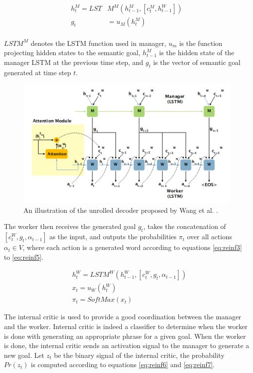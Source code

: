 \documentclass[preprint, 10pt]{elsarticle}
\begin{document}
		\begin{align}
			h_t^M = LST&M^M(h_{t-1}^M, [c_t^M, h_{t-1}^W]) \label{eq:reinf1} \\
			g_t &= u_M(h_t^M) \label{eq:reinf2}
		\end{align}
		\\
		$LSTM^M$ denotes the LSTM function used in manager, $u_m$ is the function projecting hidden states to the semantic goal, $h_{t-1}^M$ is the hidden state of the manager LSTM at the previous time step, and $g_t$ is the vector of semantic goal generated at time step $t$.
		
		\begin{figure}[h]
		\centering
		\includegraphics[scale=0.7]{Imgs/reinf2.png}
		\caption{An illustration of the unrolled decoder proposed by Wang et al. \cite{wang2018video}.}
		\label{fig:reinf2}
	\end{figure}
	
		The worker then receives the generated goal $g_t$, takes the concatenation of $[c_t^W, g_t, \alpha_{t-1}]$ as the input, and outputs the probabilities $\pi_t$ over all actions $\alpha_t \in V$, where each action is a generated word according to equations \eqref{eq:reinf3} to \eqref{eq:reinf5}.
		
		\begin{align}
			&h_t^W = LSTM^W(h_{t-1}^W, [c_t^W, g_t, \alpha_{t-1}]) \label{eq:reinf3} \\
			&x_t = u_W(h_t^W) \label{eq:reinf4} \\
			&\pi_t = SoftMax(x_t) \label{eq:reinf5} 
		\end{align}
		
		The internal critic is used to provide a good coordination between the manager and the worker. Internal critic is indeed a classifier to determine when the worker is done with generating an appropriate phrase for a given goal. When the worker is done, the internal critic sends an activation signal to the manager to generate a new goal. Let $z_t$ be the binary signal of the internal critic, the probability $Pr(z_t)$ is computed according to equations \eqref{eq:reinf6} and \eqref{eq:reinf7}.
		
\end{document}
